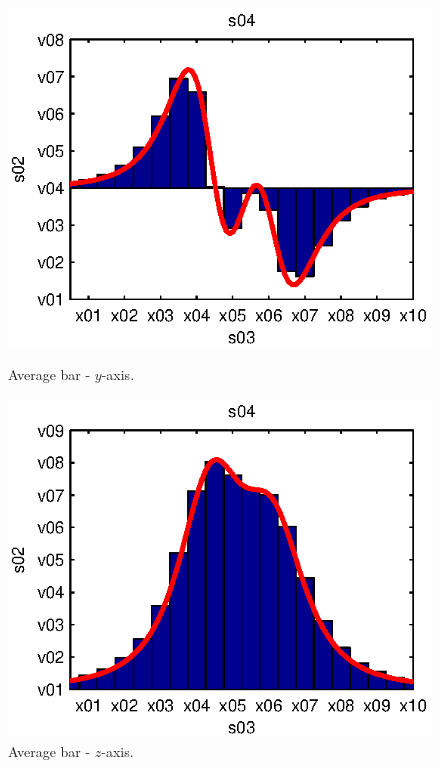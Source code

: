 \begin{subfigures}
\begin{figure}
 \centering
 \begin{minipage}{0.45\linewidth}
 \centering
  
  \includegraphics[width=1\linewidth]{images/avb-y}
 \caption[Average bar - $y$-axis]{Average bar - $y$-axis.}
 \label{fig:bar1}
 \end{minipage}\hfill
 \begin{minipage}{0.45\linewidth}
 \centering
 
  \includegraphics[width=1\linewidth]{images/avb-z}
 \caption[Average bar - $z$-axis]{Average bar - $z$-axis.}
 \label{fig:bar2}
 \end{minipage}
\end{figure}
\end{subfigures}

